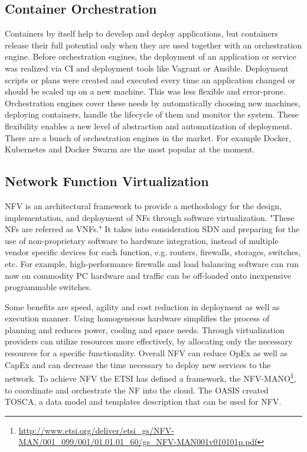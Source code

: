 \subsection{Container Orchestration}
Containers by itself help to develop and deploy applications, but containers release their full potential only when they are used together with an orchestration engine.
Before orchestration engines, the deployment of an application or service was realized via \ac{CI} and deployment tools like Vagrant or Ansible.
Deployment scripts or plans were created and executed every time an application changed or should be scaled up on a new machine.
This was less flexible and error-prone.
Orchestration engines cover these needs by automatically choosing new machines, deploying containers, handle the lifecycle of them and monitor the system.
These flexibility enables a new level of abstraction and automatization of deployment.
There are a bunch of orchestration engines in the market.
For example Docker, Kubernetes and Docker Swarm are the most popular at the moment.


\subsection{Network Function Virtualization}
\ac{NFV} is an architectural framework to provide a methodology for the design, implementation, and deployment of \acp{NF} through software virtualization.\autocite[cf.][p. 8]{ETSI:NFV:2013}\autocite[cf.]{Rivenes:2014}
"These \acp{NF} are referred as \acp{VNF}."\autocite[p. 8]{ETSI:NFV:2013}
It takes into consideration \ac{SDN} and preparing for the use of non-proprietary software to hardware integration, instead of multiple vendor specific devices for each function, e.g. routers, firewalls, storages, switches, etc.\autocite[cf.]{Rivenes:2014}
For example, high-performance firewalls and load balancing software can run now on commodity PC hardware and traffic can be off-loaded onto inexpensive programmable switches.\autocite[cf.]{Noble:2015}

Some benefits are speed, agility and cost reduction in deployment as well as execution manner.\autocite[cf.]{Noble:2015}
Using homogeneous hardware simplifies the process of planning and reduces power, cooling and space needs.\autocite[cf.]{Noble:2015}
Through virtualization providers can utilize resources more effectively, by allocating only the necessary resources for a specific functionality.\autocite[cf.]{Noble:2015}
Overall \ac{NFV} can reduce \ac{OpEx} as well as \ac{CapEx} and can decrease the time necessary to deploy new services to the network.\autocite[cf.]{Noble:2015}
To achieve \ac{NFV} the \ac{ETSI} has defined a framework, the \ac{NFV-MANO}\footnote{\url{http://www.etsi.org/deliver/etsi_gs/NFV-MAN/001_099/001/01.01.01_60/gs_NFV-MAN001v010101p.pdf}}, to coordinate and orchestrate the \ac{NF} into the cloud.
The \ac{OASIS} created \ac{TOSCA}, a data model and templates description that can be used for \ac{NFV}.

